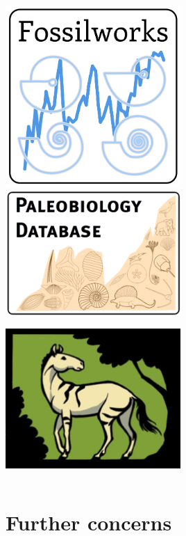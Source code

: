 \documentclass{beamer}
\begin{document}
\begin{frame}
\begin{columns}
\begin{column}{0.5\textwidth}
      \includegraphics[height = 0.3\textheight, width = 0.5\textwidth, keepaspectratio = true]{figure/fossilworks}
      \includegraphics[width = 0.5\textwidth, keepaspectratio = true]{figure/paleodb}

      \includegraphics[height = 0.3\textheight, width = 0.5\textwidth, keepaspectratio = true]{figure/now}
    \end{column}
  \end{columns}
\end{frame}



\appendix
\section{Further concerns}
\end{document}
